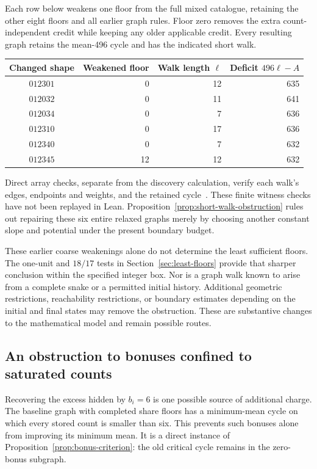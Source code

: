 \documentclass[11pt,a4paper]{article}
\theoremstyle{definition}
\theoremstyle{remark}
\begin{document}
Each row below weakens one floor from the full mixed catalogue, retaining the other eight floors and all earlier graph rules. Floor zero removes the extra count-independent credit while keeping any older applicable credit. Every resulting graph retains the mean-496 cycle and has the indicated short walk.
\begin{center}\small
\begin{tabular}{c r r r}
\toprule
Changed shape & Weakened floor & Walk length $\ell$ & Deficit $496\ell-A$\\\midrule
$012301$ & 0 & 12 & 635\\
$012032$ & 0 & 11 & 641\\
$012034$ & 0 & 7 & 636\\
$012310$ & 0 & 17 & 636\\
$012340$ & 0 & 7 & 632\\
$012345$ & 12 & 12 & 632\\
\bottomrule
\end{tabular}
\end{center}
Direct array checks, separate from the discovery calculation, verify each walk's edges, endpoints and weights, and the retained cycle~\cite{obstructionarchive}. These finite witness checks have not been replayed in Lean. Proposition~\ref{prop:short-walk-obstruction} rules out repairing these six entire relaxed graphs merely by choosing another constant slope and potential under the present boundary budget.

These earlier coarse weakenings alone do not determine the least sufficient floors. The one-unit and $18/17$ tests in Section~\ref{sec:least-floors} provide that sharper conclusion within the specified integer box. Nor is a graph walk known to arise from a complete snake or a permitted initial history. Additional geometric restrictions, reachability restrictions, or boundary estimates depending on the initial and final states may remove the obstruction. These are substantive changes to the mathematical model and remain possible routes.


\subsection{An obstruction to bonuses confined to saturated counts}\label{sec:unsaturated-obstruction}
Recovering the excess hidden by $b_i=6$ is one possible source of additional
charge. The baseline graph with completed share floors has a minimum-mean cycle on which every
stored count is smaller than six. This prevents such bonuses alone from
improving its minimum mean. It is a direct instance of
Proposition~\ref{prop:bonus-criterion}: the old critical cycle remains in
the zero-bonus subgraph.
\end{document}
